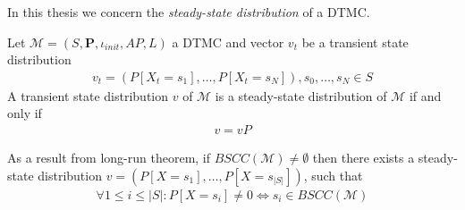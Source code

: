 In this thesis we concern the \textit{steady-state distribution} of a DTMC.
\begin{definition}
    Let $\mathcal{M}=(S,\mathbf{P}, \iota_{init}, AP,L)$ a DTMC and vector $v_t$ be a transient state distribution
    \begin{align*}
        v_t = (P[X_t=s_1],\ldots,P[X_t=s_N]), s_0,\ldots,s_N \in S
    \end{align*}
    A transient state distribution $v$ of $\mathcal{M}$ is a steady-state distribution of $\mathcal{M}$ if and only if
    \begin{align*}
        v = vP
    \end{align*}
\end{definition}
As a result from long-run theorem, if $BSCC(\mathcal{M})\neq \emptyset$ then there exists a
steady-state distribution $v = (P[X=s_1],\ldots,P[X=s_{|S|}])$, such that
\begin{align*}
    \forall 1 \leq i \leq |S|: P[X=s_i] \neq 0 \Leftrightarrow s_i \in BSCC(\mathcal{M})
\end{align*}



